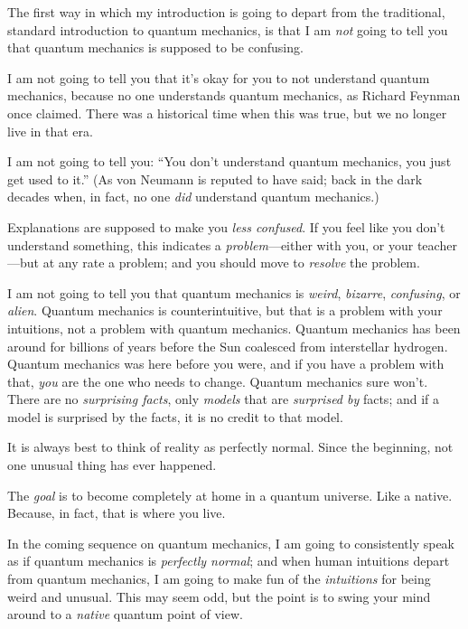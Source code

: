 {
 The first way in which my introduction is going to depart from the
traditional, standard introduction to quantum mechanics, is that I am
\textit{not} going to tell you that quantum mechanics is supposed to be
confusing.}

{
 I am not going to tell you that it's okay for you
to not understand quantum mechanics, because no one understands quantum
mechanics, as Richard Feynman once claimed. There was a historical time
when this was true, but we no longer live in that era.}

{
 I am not going to tell you: ``You
don't understand quantum mechanics, you just get used
to it.'' (As von Neumann is reputed to have said;
back in the dark decades when, in fact, no one \textit{did} understand
quantum mechanics.)}

{
 Explanations are supposed to make you \textit{less confused}. If
you feel like you don't understand something, this
indicates a \textit{problem}{}---either with you, or your teacher---but
at any rate a problem; and you should move to \textit{resolve} the
problem.}

{
 I am not going to tell you that quantum mechanics is
\textit{weird}, \textit{bizarre}, \textit{confusing}, or
\textit{alien}. Quantum mechanics is counterintuitive, but that is a
problem with your intuitions, not a problem with quantum mechanics.
Quantum mechanics has been around for billions of years before the Sun
coalesced from interstellar hydrogen. Quantum mechanics was here before
you were, and if you have a problem with that, \textit{you} are the one
who needs to change. Quantum mechanics sure won't.
There are no \textit{surprising facts}, only \textit{models} that are
\textit{surprised by} facts; and if a model is surprised by the facts,
it is no credit to that model.}

{
 It is always best to think of reality as perfectly normal. Since
the beginning, not one unusual thing has ever happened.}

{
 The \textit{goal} is to become completely at home in a quantum
universe. Like a native. Because, in fact, that is where you live.}

{
 In the coming sequence on quantum mechanics, I am going to
consistently speak as if quantum mechanics is \textit{perfectly
normal}; and when human intuitions depart from quantum mechanics, I am
going to make fun of the \textit{intuitions} for being weird and
unusual. This may seem odd, but the point is to swing your mind around
to a \textit{native} quantum point of view.}


